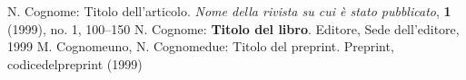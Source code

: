\begin{thebibliography}{widest entry}
   N. Cognome: Titolo dell'articolo. \textit{Nome della rivista su cui è stato pubblicato}, \textbf{1} (1999), no. 1, 100--150
   N. Cognome: \textbf{Titolo del libro}. Editore, Sede dell'editore, 1999
   M. Cognomeuno, N. Cognomedue: Titolo del preprint. Preprint, codicedelpreprint (1999)
\end{thebibliography}
